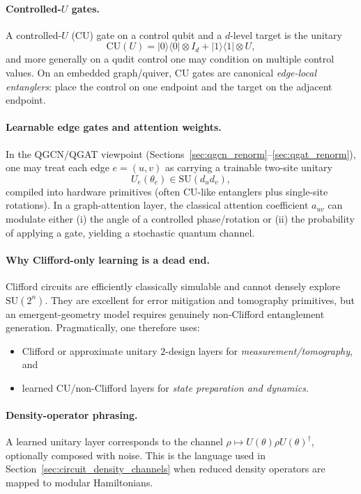 \documentclass[11pt,oneside]{amsbook}
\numberwithin{equation}{section}
\theoremstyle{plain}
\theoremstyle{definition}
\theoremstyle{remark}
\begin{document}
\paragraph{Controlled-$U$ gates.}
A controlled-$U$ (CU) gate on a control qubit and a $d$-level target is the unitary
\[
\mathrm{CU}(U)=|0\rangle\!\langle0|\otimes I_d + |1\rangle\!\langle1|\otimes U,
\]
and more generally on a qudit control one may condition on multiple control values.
On an embedded graph/quiver, CU gates are canonical \emph{edge-local entanglers}: place the control on one endpoint and the target on the adjacent endpoint.

\paragraph{Learnable edge gates and attention weights.}
In the QGCN/QGAT viewpoint (Sections~\ref{sec:qgcn_renorm}--\ref{sec:qgat_renorm}), one may treat each edge $e=(u,v)$ as carrying a trainable two-site unitary
\[
U_e(\theta_e)\in \mathrm{SU}(d_ud_v),
\]
compiled into hardware primitives (often CU-like entanglers plus single-site rotations).
In a graph-attention layer, the classical attention coefficient $a_{uv}$ can modulate either (i) the angle of a controlled phase/rotation or (ii) the probability of applying a gate, yielding a stochastic quantum channel.

\paragraph{Why Clifford-only learning is a dead end.}
Clifford circuits are efficiently classically simulable and cannot densely explore $\mathrm{SU}(2^n)$.
They are excellent for error mitigation and tomography primitives, but an emergent-geometry model requires genuinely non-Clifford entanglement generation.
Pragmatically, one therefore uses:
\begin{itemize}
\item Clifford or approximate unitary $2$-design layers for \emph{measurement/tomography}, and
\item learned CU/non-Clifford layers for \emph{state preparation and dynamics}.
\end{itemize}

\paragraph{Density-operator phrasing.}
A learned unitary layer corresponds to the channel $\rho\mapsto U(\theta)\rho U(\theta)^\dagger$, optionally composed with noise.
This is the language used in Section~\ref{sec:circuit_density_channels} when reduced density operators are mapped to modular Hamiltonians.
\end{document}
